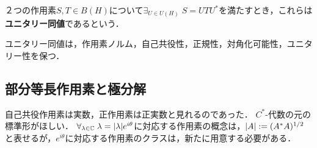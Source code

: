 \documentclass[uplatex,dvipdfmx]{jsreport}
\begin{document}
\begin{definition}
    ２つの作用素$S,T\in B(H)$について$\exists_{U\in U(H)}\;S=UTU^*$を満たすとき，これらは\textbf{ユニタリー同値}であるという．
\end{definition}

\begin{lemma}
    ユニタリー同値は，作用素ノルム，自己共役性，正規性，対角化可能性，ユニタリー性を保つ．
\end{lemma}

\subsection{部分等長作用素と極分解}

\begin{tcolorbox}[colframe=ForestGreen, colback=ForestGreen!10!white,breakable,colbacktitle=ForestGreen!40!white,coltitle=black,fonttitle=\bfseries\sffamily,
title=]
    自己共役作用素は実数，正作用素は正実数と見れるのであった．
    $C^*$-代数の元の標準形がほしい．
    $\forall_{\lambda\in\mathbb{C}}\;\lambda=\lvert\lambda\rvert e^{i\theta}$に対応する作用素の概念は，$\lvert A\rvert:=(A^*A)^{1/2}$と表せるが，$e^{i\theta}$に対応する作用素のクラスは，新たに用意する必要がある．
\end{tcolorbox}
\end{document}
